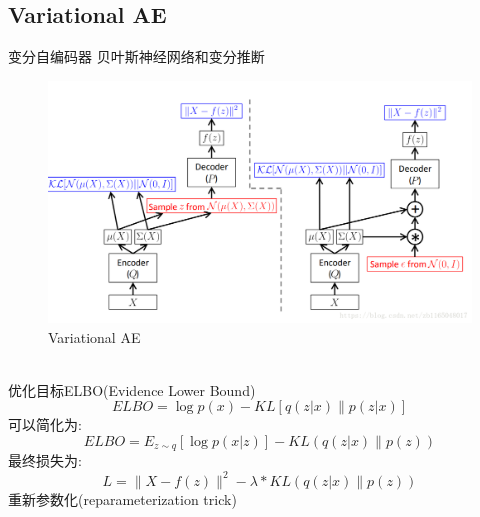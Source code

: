 \documentclass{article}
\begin{document}
\subsection{Variational AE}
变分自编码器
贝叶斯神经网络和变分推断
\begin{figure}[h]
\centering
\includegraphics[height=0.5\linewidth]{7.png}
\caption{Variational AE}
\end{figure}\\
优化目标ELBO(Evidence Lower Bound)
\begin{equation}
ELBO=\log p(x)-KL[q(z|x)\parallel p(z|x)] \tag{3.5.1}
\end{equation}
可以简化为:
\begin{equation}
ELBO=E_{z \sim q}[\log p(x|z)] -KL(q(z|x) \parallel p(z))
\end{equation}
最终损失为:
\begin{equation}
L=\parallel X-f(z) \parallel ^2-\lambda*KL(q(z|x) \parallel p(z))
\end{equation}
重新参数化(reparameterization trick)\\
\end{document}
